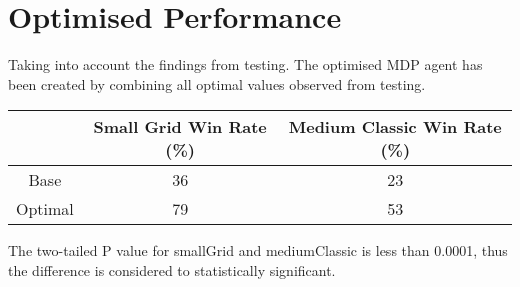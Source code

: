 \documentclass[12pt]{report}
\begin{document}
  \section*{Optimised Performance}
  Taking into account the findings from testing. The optimised MDP agent has been created by combining all optimal values observed from testing.

  \begin{table}[H]
    \begin{center}
      \begin{adjustbox}{max width=\textwidth}
      \begin{tabular}{*{3}{c}}
        \textbf{} & \textbf{Small Grid Win Rate (\%)} & \textbf{Medium Classic Win Rate (\%)} \\
        \hline
              Base & 36 & 23 \\
              Optimal & 79 & 53 \\

      \end{tabular}
      \end{adjustbox}
    \end{center}
  \end{table}
  \vspace{-9mm}
  The two-tailed P value for smallGrid and mediumClassic is less than 0.0001, thus the difference is considered to statistically significant.
\end{document}
